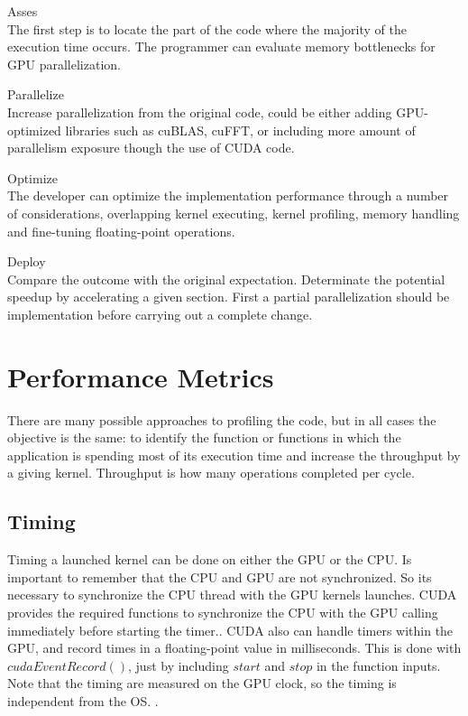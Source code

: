 \begin{description}

 \item{Asses} \hfill \\
 The first step is to locate the part of the code where the majority of the execution time occurs. The programmer can evaluate memory bottlenecks for GPU parallelization. 
 \item{Parallelize} \hfill \\
 Increase parallelization from the original code, could be either adding GPU-optimized libraries such as cuBLAS, cuFFT, or including more amount of parallelism exposure though the use of CUDA code.
 \item{Optimize} \hfill \\
The developer can optimize the implementation performance through a number of considerations, overlapping kernel executing, kernel profiling, memory handling and fine-tuning floating-point operations.
 \item{Deploy} \hfill \\
 Compare the outcome with the original expectation. Determinate the potential speedup by accelerating a given section. First a partial parallelization should be implementation before carrying out a complete change.
 \end{description} 


\section{Performance Metrics}

There are many possible approaches to profiling the code, but in all cases the objective is the same: to identify the function or functions in which the application is spending most of its execution time and increase the throughput by a giving kernel. Throughput is how many operations completed per cycle.

\subsection{Timing}

Timing a launched kernel can be done on either the GPU or the CPU. Is important to remember that the CPU and GPU are not synchronized. So its necessary to synchronize the CPU thread with the GPU kernels launches. CUDA provides the required  functions to synchronize the CPU with the GPU calling immediately before starting the timer.\cite{practices}.  CUDA also can handle timers within the GPU, and record times in a floating-point value in milliseconds. This is done with $cudaEventRecord()$, just by including $start$ and $stop$ in the function inputs. Note that the timing are measured on the GPU clock, so the timing is independent from the OS. \cite{cook}.


